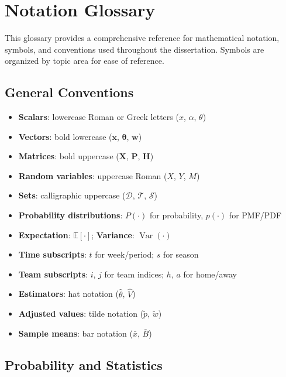 \chapter*{Notation Glossary} \label{app:notation}

This glossary provides a comprehensive reference for mathematical notation, symbols, and conventions used throughout the dissertation. Symbols are organized by topic area for ease of reference.

\section*{General Conventions}

\begin{itemize}[nosep]
  \item \textbf{Scalars}: lowercase Roman or Greek letters ($x$, $\alpha$, $\theta$)
  \item \textbf{Vectors}: bold lowercase ($\mathbf{x}$, $\boldsymbol{\theta}$, $\mathbf{w}$)
  \item \textbf{Matrices}: bold uppercase ($\mathbf{X}$, $\mathbf{P}$, $\mathbf{H}$)
  \item \textbf{Random variables}: uppercase Roman ($X$, $Y$, $M$)
  \item \textbf{Sets}: calligraphic uppercase ($\mathcal{D}$, $\mathcal{T}$, $\mathcal{S}$)
  \item \textbf{Probability distributions}: $P(\cdot)$ for probability, $p(\cdot)$ for PMF/PDF
  \item \textbf{Expectation}: $\mathbb{E}[\cdot]$; \textbf{Variance}: $\operatorname{Var}(\cdot)$
  \item \textbf{Time subscripts}: $t$ for week/period; $s$ for season
  \item \textbf{Team subscripts}: $i$, $j$ for team indices; $h$, $a$ for home/away
  \item \textbf{Estimators}: hat notation ($\hat{\theta}$, $\hat{V}$)
  \item \textbf{Adjusted values}: tilde notation ($\tilde{p}$, $\tilde{w}$)
  \item \textbf{Sample means}: bar notation ($\bar{x}$, $\bar{B}$)
\end{itemize}

\section*{Probability and Statistics}

